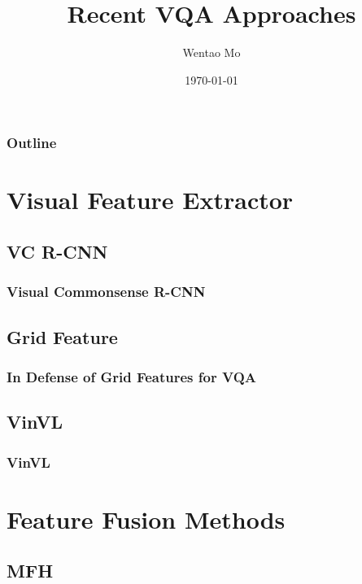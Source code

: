 \documentclass{beamer}
\title[PKUAI]{Recent VQA Approaches}
\author[Wentao Mo]
{Wentao Mo\inst{1}}
\institute[AI@PKU] 
{
    \inst{1}%
    Department of Machine Intelligence\\
    Peking University
}
\date[PKU]{\today}
\begin{document}
\frame{\titlepage}

\begin{frame}
    \frametitle{Outline}
    \tableofcontents
\end{frame}

\section{Visual Feature Extractor}

\subsection{VC R-CNN}

\begin{frame}
    \frametitle{Visual Commonsense R-CNN}

    

\end{frame}

\subsection{Grid Feature}

\begin{frame}
    \frametitle{In Defense of Grid Features for VQA}

    

\end{frame}

\subsection{VinVL}

\begin{frame}
    \frametitle{VinVL}

    

\end{frame}

\section{Feature Fusion Methods}

\subsection{MFH}
\end{document}
